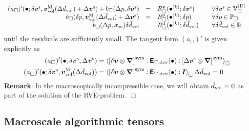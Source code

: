 \documentclass[10pt,a4paper]{article}
\newcommand{\ded}{\mathrm{d}}
\newcommand{\dep}{\mathrm{p}}
\begin{document}
\begin{equation}
\begin{array}{rcll}
    (a_\Box)'(\bullet; \delta\ta{v}^\fluct,\ta{v}^\macro_\vol(\Delta\bar{d}_\vol) + \Delta \ta{v}^\fluct)
    + b_\Box(\Delta p,\delta\ta{v}^\fluct)
    & = &
    R_\Box^{\ta v}(\bullet^{(k)}; \delta\ta{v}^\fluct)
    \quad & \forall \delta \ta{v}^\fluct\in\set{V}_\Box^{(\Dirichlet)}
    \\
    b_\Box(\delta p,\ta{v}^\macro_\vol(\Delta\bar{d}_\vol) + \Delta\ta{v}^\fluct)
    & = &
    R_\Box^\dep(\bullet^{(k)}; \delta p)
    \quad & \forall \delta p\in\set{P}_\Box
    \\
    b_\Box(\Delta p,\ta{x}_\mean)\delta\bar{d}_\vol
    & = &
    R_\Box^\ded(\bullet^{(k)}; \delta\bar{d}_\vol)
    \quad & \forall \delta\bar{d}_\vol  \in \set{R}
\end{array}
\label{eq252b}
\end{equation}
until the residuals are sufficiently small. The tangent form $(a_\Box)'$
is given explicitly as
\begin{align}
    (a_\Box)'(\bullet; \delta \boldsymbol{v}^{\mathrm{s}},\Delta{\boldsymbol{v}}^{\mathrm{s}})
    & = 
    \left\langle \left[\delta\boldsymbol{v}\mathbin{\otimes}\boldsymbol{\nabla}\right]^{\mathrm{sym}} \mathbin{\vcentcolon} \boldsymbol{\mathsf{E}}_{\mathrm{T},\mathrm{dev}}(\bullet) \mathbin{\vcentcolon}
    \left[\Delta\boldsymbol{v}^{\mathrm{s}}\mathbin{\otimes}\boldsymbol{\nabla}\right]^{\mathrm{sym}} \right\rangle_\Box
\label{eq253a} \\
    (a_\Box)'(\bullet; \delta \boldsymbol{v}^{\mathrm{s}},\boldsymbol{v}^{\mathrm{M}}_{\mathrm{vol}}(\Delta\bar{d}_{\mathrm{vol}}))
    & = 
    \left\langle \left[\delta\boldsymbol{v}\mathbin{\otimes}\boldsymbol{\nabla}\right]^{\mathrm{sym}} \mathbin{\vcentcolon} \boldsymbol{\mathsf{E}}_{\mathrm{T},\mathrm{dev}}(\bullet) \mathbin{\vcentcolon}
    \boldsymbol{I} \right\rangle_\Box\Delta\bar{d}_{\mathrm{vol}} = 0
\label{eq253b}
\end{align}
\textbf{Remark}: In the macroscopically incompressible case, we will obtain $\bar{d}_{\mathrm{vol}}=0$ as part of the solution of the RVE-problem. $\Box$

\subsection{Macroscale algorithmic tensors}
\end{document}
